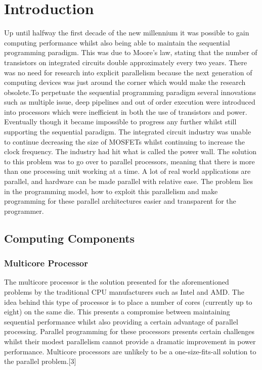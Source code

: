 



\chapter{Introduction} 
Up until halfway the first decade of the new millennium it was possible to gain computing performance whilst also being able to maintain the sequential programming paradigm. This was due to Moore's law, stating that the number of transistors on integrated circuits double approximately every two years. There was no need for research into explicit parallelism because the next generation of computing devices was just around the corner which would make the research obsolete.To perpetuate the sequential programming paradigm several innovations such as multiple issue, deep pipelines and out of order execution were introduced into processors which were inefficient in both the use of transistors and power.  Eventually though it became impossible to progress any further whilst still supporting the sequential paradigm. The integrated circuit industry was unable to continue decreasing the size of MOSFETs whilst continuing to increase the clock frequency. The industry had hit what is called the power wall.
The solution to this problem was to go over to parallel processors, meaning that there is more than one processing unit working at a time. A lot of real world applications are parallel, and hardware can be made parallel with relative ease. The problem lies in the programming model, how to exploit this parallelism and make programming for these parallel architectures easier and transparent for the programmer.

\section{Computing Components}

\subsection{Multicore Processor}
The multicore processor is the solution presented for the aforementioned problems by the traditional CPU manufacturers such as Intel and AMD. The idea behind this type of processor is to place a number of cores (currently up to eight) on the same die. This presents a compromise between maintaining sequential performance whilst also providing a certain advantage of parallel processing. Parallel programming for these processors presents certain challenges whilst their modest parallelism cannot provide a dramatic improvement in power performance. Multicore processors are unlikely to be a one-size-fits-all solution to the parallel problem.[3]

